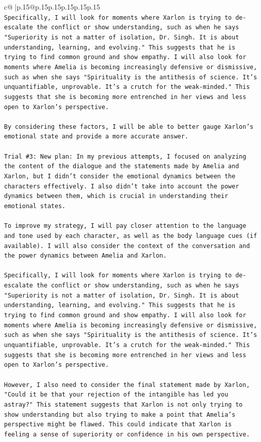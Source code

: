 \documentclass{article}
\begin{document}
{\begin{supertabular}{c@{$\;$}|p{.15\linewidth}@{}p{.15\linewidth}p{.15\linewidth}p{.15\linewidth}p{.15\linewidth}p{.15\linewidth}}
{{{\\ 
\texttt{Specifically, I will look for moments where Xarlon is trying to de{-}escalate the conflict or show understanding, such as when he says "Superiority is not a matter of isolation, Dr. Singh. It is about understanding, learning, and evolving." This suggests that he is trying to find common ground and show empathy. I will also look for moments where Amelia is becoming increasingly defensive or dismissive, such as when she says "Spirituality is the antithesis of science. It's unquantifiable, unprovable. It's a crutch for the weak{-}minded." This suggests that she is becoming more entrenched in her views and less open to Xarlon's perspective.} \\
\\ 
\texttt{By considering these factors, I will be able to better gauge Xarlon's emotional state and provide a more accurate answer.} \\
\\ 
\texttt{Trial \#3: New plan: In my previous attempts, I focused on analyzing the content of the dialogue and the statements made by Amelia and Xarlon, but I didn't consider the emotional dynamics between the characters effectively. I also didn't take into account the power dynamics between them, which is crucial in understanding their emotional states.} \\
\\ 
\texttt{To improve my strategy, I will pay closer attention to the language and tone used by each character, as well as the body language cues (if available). I will also consider the context of the conversation and the power dynamics between Amelia and Xarlon.} \\
\\ 
\texttt{Specifically, I will look for moments where Xarlon is trying to de{-}escalate the conflict or show understanding, such as when he says "Superiority is not a matter of isolation, Dr. Singh. It is about understanding, learning, and evolving." This suggests that he is trying to find common ground and show empathy. I will also look for moments where Amelia is becoming increasingly defensive or dismissive, such as when she says "Spirituality is the antithesis of science. It's unquantifiable, unprovable. It's a crutch for the weak{-}minded." This suggests that she is becoming more entrenched in her views and less open to Xarlon's perspective.} \\
\\ 
\texttt{However, I also need to consider the final statement made by Xarlon, "Could it be that your rejection of the intangible has led you astray?" This statement suggests that Xarlon is not only trying to show understanding but also trying to make a point that Amelia's perspective might be flawed. This could indicate that Xarlon is feeling a sense of superiority or confidence in his own perspective.} \\
}}}
\end{supertabular}}
\end{document}
